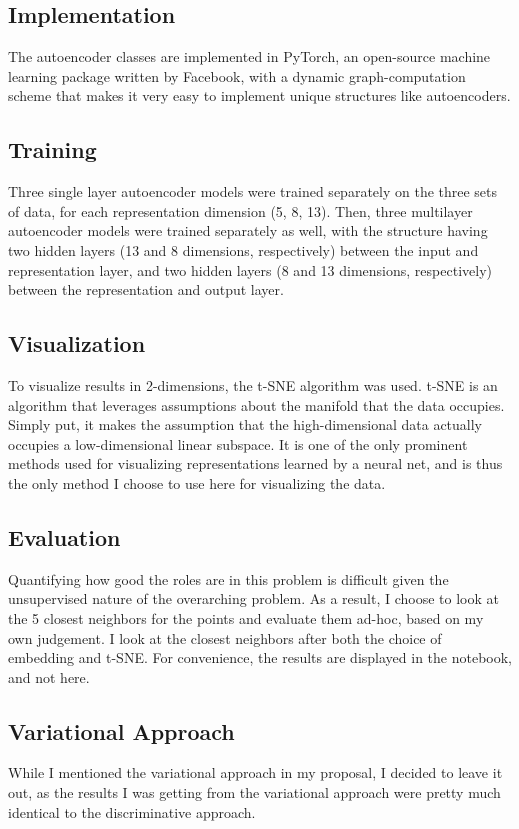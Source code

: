 \documentclass[12pt]{article}
\begin{document}
    \subsection{Implementation}
    The autoencoder classes are implemented in PyTorch, an open-source machine learning package written by Facebook, with a dynamic graph-computation scheme that makes it very easy to implement unique structures like autoencoders.
    \subsection{Training}
    Three single layer autoencoder models were trained separately on the three sets of data, for each representation dimension (5, 8, 13). Then, three multilayer autoencoder models were trained separately as well, with the structure having two hidden layers (13 and 8 dimensions, respectively) between the input and representation layer, and two hidden layers (8 and 13 dimensions, respectively) between the representation and output layer.
    \subsection{Visualization}
    To visualize results in 2-dimensions, the t-SNE algorithm was used. t-SNE is an algorithm that leverages assumptions about the manifold that the data occupies. Simply put, it makes the assumption that the high-dimensional data actually occupies a low-dimensional linear subspace. It is one of the only prominent methods used for visualizing representations learned by a neural net, and is thus the only method I choose to use here for visualizing the data.
    \subsection{Evaluation}
    Quantifying how good the roles are in this problem is difficult given the unsupervised nature of the overarching problem. As a result, I choose to look at the 5 closest neighbors for the points and evaluate them ad-hoc, based on my own judgement. I look at the closest neighbors after both the choice of embedding and t-SNE. For convenience, the results are displayed in the notebook, and not here.
    \subsection{Variational Approach}
    While I mentioned the variational approach in my proposal, I decided to leave it out, as the results I was getting from the variational approach were pretty much identical to the discriminative approach.
\end{document}
